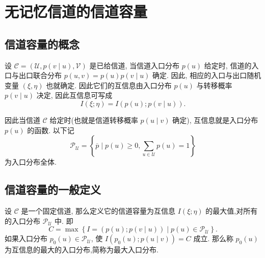 \section{无记忆信道的信道容量}
\subsection*{信道容量的概念}

设 $ \mathscr{C}=(\mathscr{U}, p(v \mid u), \mathscr{V}) $ 是已给信道, 当信道入口分布 $ p(u) $ 给定时, 信道的入口与出口联合分布 $ p(u, v)=p(u) p(v \mid u) $ 确定. 因此, 相应的入口与出口随机变量 $ (\xi, \eta) $ 也就确定. 因此它们的互信息由入口分布 $ p(u) $ 与转移概率 $ p(v \mid u) $ 决定, 因此互信息可写成
$$
I(\xi ; \eta)=I(p(u) ; p(v \mid u)) .
$$

因此当信道 $ \mathscr{C} $ 给定时(也就是信道转移概率 $ p(u \mid v) $ 确定), 互信息就是入口分布 $ p(u) $ 的函数. 以下记
$$
\mathscr{P}_{\mathscr{U}}=\left\{\overline{p} \mid p(u) \geq 0, \sum_{u \in \mathscr{U}} p(u)=1\right\}
$$
为入口分布全体.

\subsection{信道容量的一般定义}

\begin{definition}
    设 $ \mathscr{C} $ 是一个固定信道, 那么定义它的信道容量为互信息 $ I(\xi ; \eta) $ 的最大值,对所有的入口分布 $ \mathscr{P}_{\mathscr{U}} $ 中. 即
$$
C=\max \left\{I=(p(u) ; p(v \mid u)) \mid p(u) \in \mathscr{P}_{\mathscr{U}}\right\} .
$$
如果入口分布 $ p_{0}(u) \in \mathscr{P}_{\mathscr{U}} $, 使 $ I\left(p_{0}(u) ; p(u \mid v)\right)=C $ 成立. 那么称 $ p_{0}(u) $ 为互信息的最大的入口分布,简称为最大入口分布.
\end{definition}

